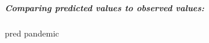 \documentclass[
  letterpaper,
  DIV=11,
  numbers=noendperiod]{scrartcl}
\let\oldsubparagraph\subparagraph
\renewcommand{\subparagraph}[1]{\oldsubparagraph{#1}\mbox{}}
\newenvironment{Shaded}{\begin{snugshade}}{\end{snugshade}}
\newcommand{\NormalTok}[1]{\textcolor[rgb]{0.00,0.23,0.31}{#1}}
\begin{document}
\hypertarget{comparing-predicted-values-to-observed-values}{%
\subparagraph{Comparing predicted values to observed
values:}\label{comparing-predicted-values-to-observed-values}}

\begin{Shaded}
\begin{Highlighting}[]
\NormalTok{pred}
\NormalTok{pandemic}
\end{Highlighting}
\end{Shaded}
\end{document}
